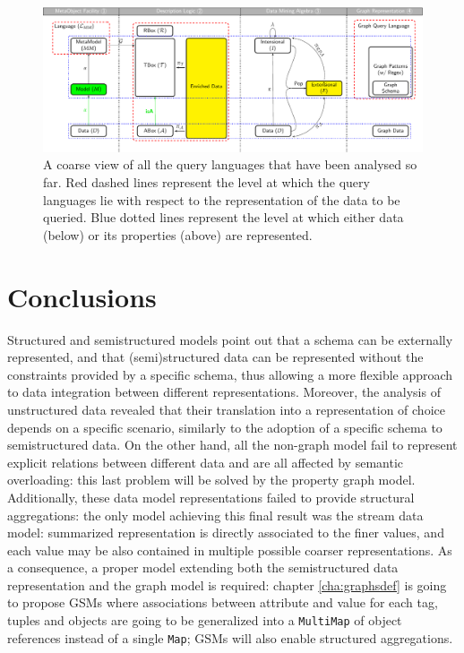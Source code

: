 \begin{figure}[!t]
	\centering
	\includegraphics[width=\textwidth]{fig/02models/taonta}
	\caption{A coarse view of all the query languages that have been analysed so far. Red dashed lines represent the level at  which the query languages lie with respect to the representation of the data to be queried. Blue dotted lines represent the level at which either data (below) or its properties (above) are represented.}
	\label{fig:taonta}
\end{figure}
\section{Conclusions}

Structured and semistructured
models point out that a schema can be externally represented, and that (semi)structured data can be represented without the constraints provided by a specific schema, thus allowing a more flexible approach to data integration between different representations. Moreover, the analysis of unstructured data revealed that their translation into a representation of choice depends on a specific scenario, similarly to the adoption of a specific schema to semistructured data.
On the other hand, all the non-graph model fail to represent explicit relations between different data and are all affected by semantic overloading: this last problem will be solved by the property graph model. Additionally, these data model representations failed to provide structural aggregations: the only model achieving this final result was the stream data model: summarized representation is directly associated to the finer values, and each value may be also contained in multiple possible coarser representations. As a consequence, a proper model extending both the semistructured data representation and the graph model is required: chapter \vref{cha:graphsdef} is going to propose GSMs where associations between attribute and value for each tag, tuples and objects are going to be generalized into a \texttt{MultiMap} of object references instead of a single \texttt{Map}; GSMs will also enable structured aggregations.

